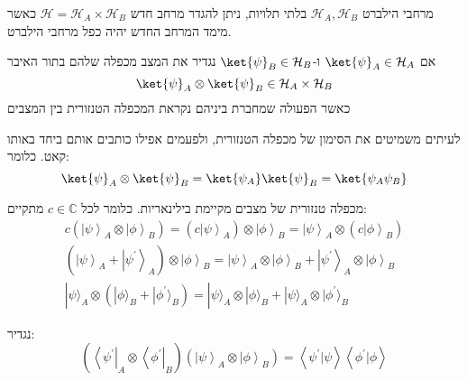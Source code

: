 \documentclass{tstextbook}
\begin{document}
\begin{definition}
מרחבי הילברט \(\mathcal{H}_{A},\mathcal{H}_{B}\) בלתי תלויות, ניתן להגדר מרחב חדש \(\mathcal{H}=\mathcal{H}_{A}\times \mathcal{H}_{B}\) כאשר מימד המרחב החדש יהיה כפל מרחבי הילברט.

\end{definition}
\begin{definition}
אם \(\ket{\psi}_{A}\in \mathcal{H}_{A}\) ו-\(\ket{\psi}_{B}\in \mathcal{H}_{B}\) נגדיר את המצב מכפלה שלהם בתור האיבר
$$\ket{\psi} _{A}\otimes \ket{\psi} _{B} \in \mathcal{H}_{A}\times \mathcal{H}_{B}$$
כאשר הפעולה שמחברת ביניהם נקראת המכפלה הטנזורית בין המצבים

\end{definition}
\begin{symbolize}
לעיתים משמיטים את הסימון של מכפלה הטנזורית, ולפעמים אפילו כותבים אותם ביחד באותו קאט. כלומר:
$$\ket{\psi} _{A}\otimes \ket{\psi} _{B}=\ket{\psi_{A}} \ket{\psi} _{B}=\ket{\psi_{A}\psi_{B}} $$

\end{symbolize}
\begin{proposition}
מכפלה טנזורית של מצבים מקיימת בילינאריות. כלומר לכל \(c \in \mathbb{C}\) מתקיים:
$$\begin{gather}c\left(\left|\psi\right\rangle_{A}\otimes\left|\phi\right\rangle_{B}\right)=\left(c\left|\psi\right\rangle_{A}\right)\otimes\left|\phi\right\rangle_{B}=\left|\psi\right\rangle_{A}\otimes\left(c\left|\phi\right\rangle_{B}\right) \\\left(\left|\psi\right\rangle_{A}+\left|\psi^{\prime}\right\rangle_{A}\right)\otimes\left|\phi\right\rangle_{B}=\left|\psi\right\rangle_{A}\otimes\left|\phi\right\rangle_{B}+\left|\psi^{\prime}\right\rangle_{A}\otimes\left|\phi\right\rangle_{B} \\|\psi\rangle_{A}\otimes(|\phi\rangle_{B}+|\phi^{\prime}\rangle_{B})=|\psi\rangle_{A}\otimes|\phi\rangle_{B}+|\psi\rangle_{A}\otimes|\phi^{\prime}\rangle_{B}
\end{gather}$$

\end{proposition}
\begin{definition}
נגדיר:
$$\left(\left\langle\psi^{\prime}\right|_{A}\otimes\left\langle\phi^{\prime}\right|_{B}\right)\left(\left|\psi\right\rangle_{A}\otimes\left|\phi\right\rangle_{B}\right)=\left\langle\psi^{\prime}|\psi\right\rangle\left\langle\phi^{\prime}|\phi\right\rangle$$

\end{definition}
\end{document}
